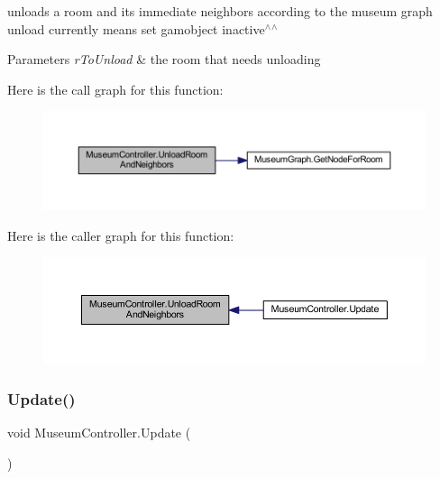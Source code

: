unloads a room and it\textquotesingle{}s immediate neighbors according to the museum graph unload currently means set gamobject inactive$^\wedge$$^\wedge$ 


\begin{DoxyParams}{Parameters}
{\em r\+To\+Unload} & the room that needs unloading\\
\hline
\end{DoxyParams}
Here is the call graph for this function\+:
\nopagebreak
\begin{figure}[H]
\begin{center}
\leavevmode
\includegraphics[width=350pt]{class_museum_controller_aa65b2ea9f99d62431282233f0582fc4a_cgraph}
\end{center}
\end{figure}
Here is the caller graph for this function\+:
\nopagebreak
\begin{figure}[H]
\begin{center}
\leavevmode
\includegraphics[width=350pt]{class_museum_controller_aa65b2ea9f99d62431282233f0582fc4a_icgraph}
\end{center}
\end{figure}
\mbox{\label{class_museum_controller_adfeaf699686c1a1aad33bd585db636b9}} 
\subsubsection{\texorpdfstring{Update()}{Update()}}
{\footnotesize\ttfamily void Museum\+Controller.\+Update (\begin{DoxyParamCaption}{ }\end{DoxyParamCaption})\hspace{0.3cm}{\ttfamily [private]}}

